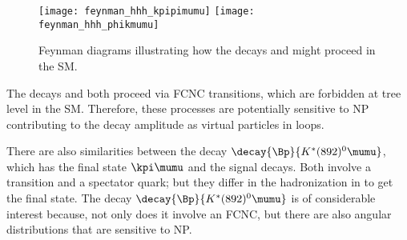 


\begin{figure}
  \begin{center}
    \texttt{[image: feynman\_hhh\_kpipimumu]}
    \texttt{[image: feynman\_hhh\_phikmumu]}
    \caption[Feynman diagrams for \btokpipimumu and \btophikmumu]{\small
      Feynman diagrams illustrating how the decays \btokpipimumu and \btophikmumu might proceed in
      the SM.
    }
    \label{fig:hhh:feyn}
  \end{center}
\end{figure}


The decays \btokpipimumu and \btophikmumu both proceed via \decay{\bquark}{\squark\mumu} FCNC
transitions, which are forbidden at tree level in the SM.
Therefore, these processes are potentially sensitive to NP contributing
to the decay amplitude as virtual particles in loops.

There are also similarities between the decay $\decay{\Bp}{K^*(892)^0\mumu}$, which has the final
state
$\kpi\mumu$ and the signal decays.
Both involve a \decay{\bquark}{\squark\mumu} transition and a spectator quark; but they differ in
the hadronization in to get the final state.
The decay $\decay{\Bp}{K^*(892)^0\mumu}$ is of considerable interest because, not only does it
involve an FCNC, but there are also angular distributions that are sensitive to NP.

